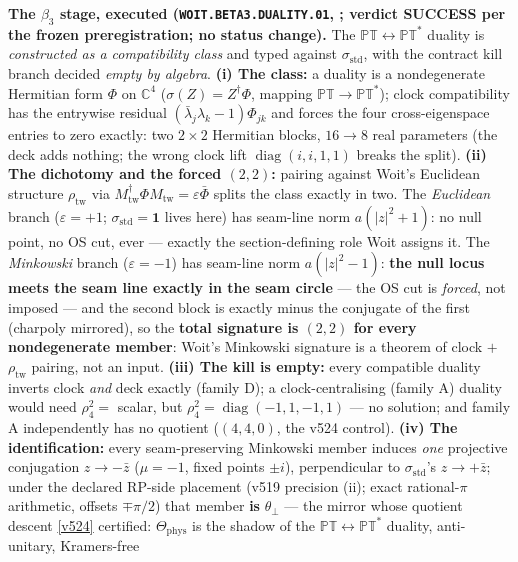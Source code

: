 \documentclass[11pt,a4paper]{article}
\begin{document}
\par\smallskip\noindent\textbf{The $\beta_3$ stage, executed
(\texttt{WOIT.BETA3.DUALITY.01}, ; verdict SUCCESS per
the frozen preregistration; no status change).}  The $\mathbb{PT}\leftrightarrow\mathbb{PT}^*$
duality is \emph{constructed as a compatibility class} and typed against
$\sigma_{\mathrm{std}}$, with the contract kill branch decided \emph{empty by algebra}.
\textbf{(i) The class:} a duality is a nondegenerate Hermitian form $\Phi$ on $\mathbb{C}^4$
($\sigma(Z)=Z^\dagger\Phi$, mapping $\mathbb{PT}\to\mathbb{PT}^*$); clock compatibility has the
entrywise residual $(\bar\lambda_j\lambda_k-1)\Phi_{jk}$ and forces the four cross-eigenspace
entries to zero exactly: two $2\times2$ Hermitian blocks, $16\to8$ real parameters (the deck
adds nothing; the wrong clock lift $\operatorname{diag}(i,i,1,1)$ breaks the split).
\textbf{(ii) The dichotomy and the forced $(2,2)$:} pairing against Woit's Euclidean structure
$\rho_{\mathrm{tw}}$ via $M_{\mathrm{tw}}^\dagger\Phi M_{\mathrm{tw}}=\varepsilon\bar\Phi$
splits the class exactly in two.  The \emph{Euclidean} branch ($\varepsilon=+1$;
$\sigma_{\mathrm{std}}=\mathbf 1$ lives here) has seam-line norm $a(|z|^2+1)$: no null point,
no OS cut, ever --- exactly the section-defining role Woit assigns it.  The \emph{Minkowski}
branch ($\varepsilon=-1$) has seam-line norm $a(|z|^2-1)$: \textbf{the null locus meets the
seam line exactly in the seam circle} --- the OS cut is \emph{forced}, not imposed --- and the
second block is exactly minus the conjugate of the first (charpoly mirrored), so the
\textbf{total signature is $(2,2)$ for every nondegenerate member}: Woit's Minkowski signature
is a theorem of clock $+$ $\rho_{\mathrm{tw}}$ pairing, not an input.  \textbf{(iii) The kill
is empty:} every compatible duality inverts clock \emph{and} deck exactly (family D); a
clock-centralising (family A) duality would need $\rho_4^2=$ scalar, but
$\rho_4^2=\operatorname{diag}(-1,1,-1,1)$ --- no solution; and family A independently has no
quotient ($(4,4,0)$, the v524 control).  \textbf{(iv) The identification:} every
seam-preserving Minkowski member induces \emph{one} projective conjugation
$z\to-\bar z$ ($\mu=-1$, fixed points $\pm i$), perpendicular to $\sigma_{\mathrm{std}}$'s
$z\to+\bar z$; under the declared RP-side placement (v519 precision (ii); exact
rational-$\pi$ arithmetic, offsets $\mp\pi/2$) that member \textbf{is} $\theta_\perp$ --- the
mirror whose quotient descent \vref{v524} certified: $\Theta_{\mathrm{phys}}$ is the shadow of
the $\mathbb{PT}\leftrightarrow\mathbb{PT}^*$ duality, anti-unitary, Kramers-free
\end{document}
